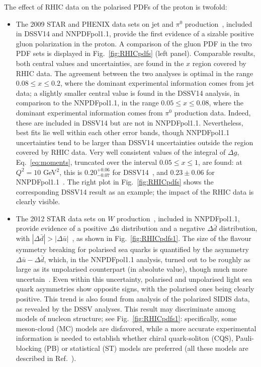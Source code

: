 The effect of RHIC data on the polarised PDFs of the proton is twofold:
\begin{itemize}

\item The 2009 STAR and PHENIX data sets on jet and $\pi^0$ 
production~\cite{Adamczyk:2014ozi,Adare:2014hsq}, included in DSSV14
and NNPDFpol1.1, provide the first evidence
of a sizable positive gluon polarization in the proton. 
%
A comparison of the gluon PDF in the two PDF sets is displayed in 
Fig.~\ref{fig:RHICpdfs} (left panel). 
%
Comparable results, both central values and uncertainties, are found in the 
$x$ region covered by RHIC data. 
%
The agreement between the two analyses is optimal in the
range $0.08\leq x \leq 0.2$, where the dominant experimental information comes
from jet data; a slightly smaller central value is found in the DSSV14 
analysis, in comparison to the NNPDFpol1.1, in the range 
$0.05\leq x \leq 0.08$, where the dominant experimental information comes from 
$\pi^0$ production data. 
%
Indeed, these are included in DSSV14 but are not
in NNPDFpol1.1. 
%
Nevertheless, best fits lie well within each other error
bands, though NNPDFpol1.1 uncertainties tend to be larger than DSSV14
uncertainties outside the region covered by RHIC data.
%
Very well consistent values of the integral of $\Delta g$, 
Eq.~\eqref{eq:moments}, truncated over the interval $0.05\leq x \leq 1$, are 
found: at $Q^2=10$ GeV$^2$, this is $0.20^{+0.06}_{-0.07}$ for 
DSSV14~\cite{deFlorian:2014yva}, and $0.23\pm 0.06$ for 
NNPDFpol1.1~\cite{Nocera:2014gqa}. The right plot in Fig.~\ref{fig:RHICpdfs} 
shows the corresponding DSSV14 result as an example; the impact of the RHIC
data is clearly visible. 

\item The 2012 STAR data sets on $W$ production~\cite{Adamczyk:2014xyw}, 
included in NNPDFpol1.1, provide evidence of a positive 
$\Delta\bar{u}$ distribution 
and a negative $\Delta\bar{d}$ distribution, with 
$|\Delta\bar{d}|>|\Delta\bar{u}|$~\cite{Nocera:2014gqa},
as shown in Fig.~\ref{fig:RHICpdfs1}.
% 
The size of the flavour symmetry breaking for polarised sea quarks is 
quantified by the asymmetry $\Delta\bar{u}-\Delta\bar{d}$, which,
in the NNPDFpol1.1 analysis, turned out to be roughly as large as its 
unpolarised counterpart (in absolute value), 
though much more uncertain~\cite{Nocera:2014rea}. 
%
Even within this uncertainty, polarised and unpolarised light sea quark 
asymmetries show opposite signs,
with the polarised ones being clearly positive.  This trend is also found
from analysis of the polarized SIDIS data, as revealed by the DSSV analyses. 
%
This result may discriminate among models of nucleon structure; 
see Fig.~\ref{fig:RHICpdfs1}: 
specifically, some meson-cloud (MC) models are disfavored, while a more 
accurate experimental information is needed to establish whether 
chiral quark-soliton (CQS), Pauli-blocking (PB) or statistical (ST)
models are preferred (all these models are described in 
Ref.~\cite{Chang:2014jba}).

\end{itemize}

